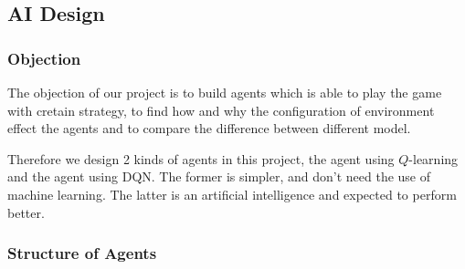 \documentclass[14pt]{extarticle}
\begin{document}
\subsection{AI Design}
\subsubsection{Objection}
The objection of our project is to build agents which is able to play the game with cretain strategy, to find how and why the configuration of environment effect the agents and to compare the difference between different model.

Therefore we design 2 kinds of agents in this project, the agent using $Q$-learning and the agent using DQN. The former is simpler, and don't need the use of machine learning. The latter is an artificial intelligence and expected to perform better.
\subsubsection{Structure of Agents}
\end{document}
